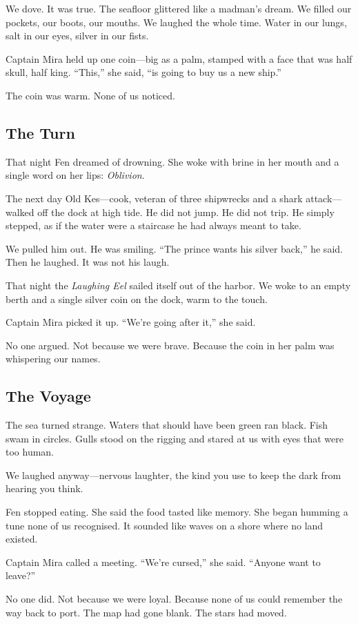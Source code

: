 \documentclass[12pt]{article}
\begin{document}
We dove. It was true. The seafloor glittered like a madman’s dream. We filled our pockets, our boots, our mouths. We laughed the whole time. Water in our lungs, salt in our eyes, silver in our fists.

Captain Mira held up one coin—big as a palm, stamped with a face that was half skull, half king. “This,” she said, “is going to buy us a new ship.”

The coin was warm. None of us noticed.

\subsection*{The Turn}
That night Fen dreamed of drowning. She woke with brine in her mouth and a single word on her lips: \textit{Oblivion}.

The next day Old Kes—cook, veteran of three shipwrecks and a shark attack—walked off the dock at high tide. He did not jump. He did not trip. He simply stepped, as if the water were a staircase he had always meant to take.

We pulled him out. He was smiling. “The prince wants his silver back,” he said. Then he laughed. It was not his laugh.

That night the \textit{Laughing Eel} sailed itself out of the harbor. We woke to an empty berth and a single silver coin on the dock, warm to the touch.

Captain Mira picked it up. “We’re going after it,” she said.

No one argued. Not because we were brave. Because the coin in her palm was whispering our names.

\subsection*{The Voyage}
The sea turned strange. Waters that should have been green ran black. Fish swam in circles. Gulls stood on the rigging and stared at us with eyes that were too human.

We laughed anyway—nervous laughter, the kind you use to keep the dark from hearing you think.

Fen stopped eating. She said the food tasted like memory. She began humming a tune none of us recognised. It sounded like waves on a shore where no land existed.

Captain Mira called a meeting. “We’re cursed,” she said. “Anyone want to leave?”

No one did. Not because we were loyal. Because none of us could remember the way back to port. The map had gone blank. The stars had moved.
\end{document}
